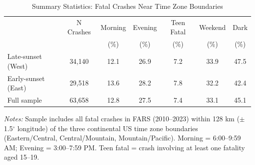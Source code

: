\begin{table}[htbp]
\centering
\caption{Summary Statistics: Fatal Crashes Near Time Zone Boundaries}
\label{tab:sumstats}
\begin{threeparttable}
\begin{tabular}{lcccccc}
\toprule
 & N Crashes & Morning & Evening & Teen Fatal & Weekend & Dark \\
 & & (\%) & (\%) & (\%) & (\%) & (\%) \\
\midrule
Late-sunset (West) & 34,140 & 12.1 & 26.9 & 7.2 & 33.9 & 47.5 \\
Early-sunset (East) & 29,518 & 13.6 & 28.2 & 7.8 & 32.2 & 42.4 \\
Full sample & 63,658 & 12.8 & 27.5 & 7.4 & 33.1 & 45.1 \\
\bottomrule
\end{tabular}
\begin{tablenotes}[flushleft]\small
\item \textit{Notes:} Sample includes all fatal crashes in FARS (2010--2023) within 128 km ($\pm$1.5$^\circ$ longitude) of the three continental US time zone boundaries (Eastern/Central, Central/Mountain, Mountain/Pacific). Morning = 6:00--9:59 AM; Evening = 3:00--7:59 PM. Teen fatal = crash involving at least one fatality aged 15--19.
\end{tablenotes}
\end{threeparttable}
\end{table}

